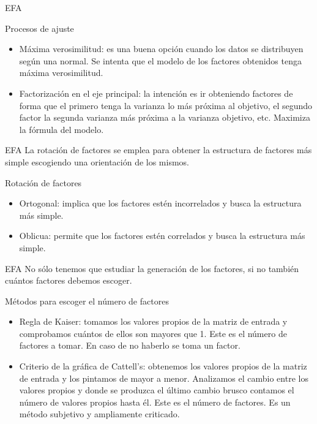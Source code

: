 \documentclass[10pt]{beamer}
\begin{document}
\begin{frame}[fragile]{EFA}
\vspace{10px}
\pause
{}
\begin{block}{Procesos de ajuste}
	\begin{itemize}
		\item Máxima verosimilitud: es una buena opción cuando los datos se distribuyen según una normal. Se intenta que el modelo de los factores obtenidos tenga máxima verosimilitud.
		\pause
		\item Factorización en el eje principal: la intención es ir obteniendo factores de forma que el primero tenga la varianza lo más próxima al objetivo, el segundo factor la segunda varianza más próxima a la varianza objetivo, etc. Maximiza la fórmula del modelo.
	\end{itemize}
\end{block}
\end{frame}

\begin{frame}[fragile]{EFA}
	La rotación de factores se emplea para obtener la estructura de factores más simple escogiendo una orientación de los mismos.
	\vspace{10px}
	\pause
	\begin{block}{Rotación de factores}
		\begin{itemize}
			\item Ortogonal: implica que los factores estén incorrelados y busca la estructura más simple.
			\pause
			\item Oblicua: permite que los factores estén correlados y busca la estructura más simple.
		\end{itemize}
	\end{block}
\end{frame}


\begin{frame}[fragile]{EFA}
No sólo tenemos que estudiar la generación de los factores, si no también cuántos factores debemos escoger.
\vspace{10px}
\pause
{}
\begin{block}{Métodos para escoger el número de factores}
	\begin{itemize}
		\item Regla de Kaiser: tomamos los valores propios de la matriz de entrada y comprobamos cuántos de ellos son mayores que 1. Este es el número de factores a tomar. En caso de no haberlo se toma un factor.
		\item Criterio de la gráfica de Cattell's: obtenemos los valores propios de la matriz de entrada y los pintamos de mayor a menor. Analizamos el cambio entre los valores propios y donde se produzca el último cambio brusco contamos el número de valores propios hasta él. Este es el número de factores. Es un método subjetivo y ampliamente criticado.
	\end{itemize}
\end{block}
\end{frame}
\end{document}
